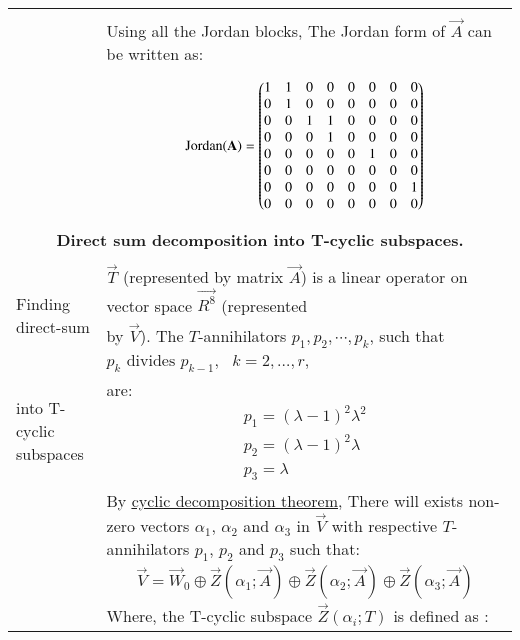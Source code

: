 \documentclass[journal,12pt]{IEEEtran}
\begin{document}
\begin{longtable}{|p{4cm}|p{14cm}|}
\begin{itemize}
        \end{itemize}\\
        &Using all the Jordan blocks, The Jordan form of $\vec{A}$ can be written as:\\
        &\begin{gather}
            \text{Jordan}(\mathbf{A})= \begin{pmatrix}1 & 1 & 0 & 0 & 0 & 0 & 0 & 0 \\
            0 & 1 & 0 & 0 & 0 & 0 & 0 & 0 \\
            0 & 0 & 1 & 1 & 0 & 0 & 0 & 0 \\
            0 & 0 & 0 & 1 & 0 & 0 & 0 & 0 \\
            0 & 0 & 0 & 0 & 0 & 1 & 0 & 0 \\
            0 & 0 & 0 & 0 & 0 & 0 & 0 & 0 \\
            0 & 0 & 0 & 0 & 0 & 0 & 0 & 1 \\
            0 & 0 & 0 & 0 & 0 & 0 & 0 & 0\end{pmatrix}
        \end{gather}\\
        \hline
        \multicolumn{2}{|c|}{\textbf{Direct sum decomposition into T-cyclic subspaces.}}\\
		\hline
\multirow{3}{*}{Finding direct-sum } & \\
        &$\vec{T}$ (represented by matrix $\vec{A}$) is a linear operator on vector space $\vec{R^8}$ (represented \\decomposition of $\vec{R^8}$
        &  by $\vec{V}$). The $T$-annihilators $p_1,p_2, \cdots, p_k$, such that $p_k \text{ divides } p_{k-1},\text{ }k=2, \hdots,r$,\\into T-cyclic subspaces
        &are: 
        \begin{align}
            p_1=(\lambda-1)^2\lambda^2 \\
            p_2=(\lambda-1)^2\lambda\\
            p_3=\lambda
        \end{align}\\
        & By  \hyperlink{Cyclicdecomposition}{\underline{cyclic decomposition theorem}}, There will exists non-zero vectors $\alpha_1$, $\alpha_2$ and $\alpha_3$ in $\vec{V}$ with respective $T$-annihilators $p_1$, $p_2$ and $p_3$ such that:
		\begin{gather}
            \vec{V}=\vec{W}_0\oplus \vec{Z}(\alpha_1;\vec{A})\oplus \vec{Z}(\alpha_2;\vec{A})\oplus \vec{Z}(\alpha_3;\vec{A})
        \end{gather}
        Where, the T-cyclic subspace $\vec{Z}(\alpha_i;T)$ is defined as :

\end{longtable}
\end{document}
